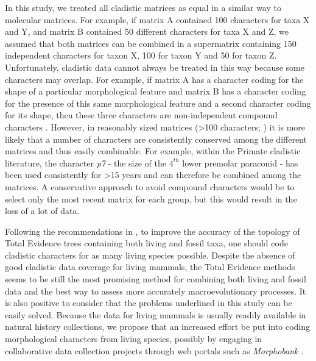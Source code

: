 \documentclass[12pt,letterpaper]{article}
\begin{document}
In this study, we treated all cladistic matrices as equal in a similar way to molecular matrices. 
For example, if matrix A contained 100 characters for taxa X and Y, and matrix B contained 50 different characters for taxa X and Z, we assumed that both matrices can be combined in a supermatrix containing 150 independent characters for taxon X, 100 for taxon Y and 50 for taxon Z.
Unfortunately, cladistic data cannot always be treated in this way because some characters may overlap.
For example, if matrix A has a character coding for the shape of a particular morphological feature and matrix B has a character coding for the presence of this same morphological feature and a second character coding for its shape, then these three characters are non-independent compound characters \citep{Brazeau2011}.
However, in reasonably sized matrices (\textgreater 100 characters; \citealp{GuillermeCooper,harrisonamong-character2014}) it is more likely that a number of characters are consistently conserved among the different matrices and thus easily combinable.
For example, within the Primate cladistic literature, the character \textit{p7} - the size of the $4^{th}$ lower premolar paraconid - has been used consistently for \textgreater 15 years \citep[e.g.][]{ross1998phylogenetic,marivaux2005anthropoid,kay2008anatomy,boyer2010astragalar,ni2013oldest} and can therefore be combined among the matrices.
A conservative approach to avoid compound characters would be to select only the most recent matrix for each group, but this would result in the loss of a lot of data.

Following the recommendations in \citep{GuillermeCooper}, to improve the accuracy of the topology of Total Evidence trees containing both living and fossil taxa, one should code cladistic characters for as many living species possible. 
Despite the absence of good cladistic data coverage for living mammals, the Total Evidence methods seems to be still the most promising method for combining both living and fossil data and the best way to assess more accurately macroevolutionary processes. %
It is also positive to consider that the problems underlined in this study can be easily solved. %
Because the data for living mammals is usually readily available in natural history collections, we propose that an increased effort be put into coding morphological characters from living species, possibly by engaging in collaborative data collection projects through web portals such as \textit{Morphobank} \citep{morphobank}.
\end{document}
